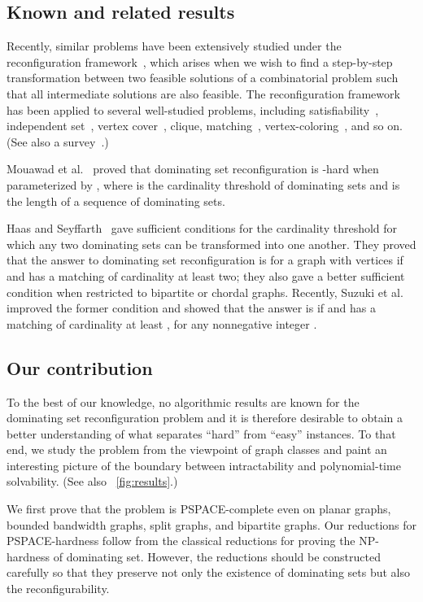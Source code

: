 \documentclass{llncs}
\begin{document}
\subsection{Known and related results}

Recently, similar problems have been extensively studied under the
reconfiguration framework~\cite{IDHPSUU}, which arises when we
wish to find a step-by-step transformation between two feasible solutions of
a combinatorial problem such that all intermediate solutions are also feasible.
The reconfiguration framework has been applied to several well-studied problems, including
{\sc satisfiability}~\cite{Kolaitis},
{\sc independent set}~\cite{HearnDemaine2005,IDHPSUU,KaminskiMM12,MNRSS13,Wro14},
{\sc vertex cover}~\cite{IDHPSUU,INZ14,MNR14,MNRSS13},
{\sc clique}, {\sc matching}~\cite{IDHPSUU},
{\sc vertex-coloring}~\cite{BC09},
and so on. (See also a survey~\cite{van13}.)

Mouawad et al.~\cite{MNRSS13} proved that {\sc dominating set reconfiguration} is -hard
when parameterized by , where  is the cardinality threshold
of dominating sets and  is the length of a sequence of dominating sets.
	
Haas and Seyffarth~\cite{HS14} gave sufficient conditions for the
cardinality threshold  for which any two dominating sets can be transformed into one another.
They proved that the answer to {\sc dominating set reconfiguration} is  for
a graph  with  vertices if  and  has a matching of cardinality at least two;
they also gave a better sufficient condition when restricted to bipartite or chordal graphs.
Recently, Suzuki et al.~\cite{SMN14} improved the former condition and showed
that the answer is  if  and  has a matching of
cardinality at least , for any nonnegative integer .

\subsection{Our contribution}
	
To the best of our knowledge, no algorithmic results are known
for the {\sc dominating set reconfiguration} problem and it is therefore desirable
to obtain a better understanding of what separates ``hard'' from ``easy'' instances.
To that end, we study the problem from the viewpoint of
graph classes and paint an interesting picture of the boundary
between intractability and polynomial-time solvability.
(See also \figurename~\ref{fig:results}.)

We first prove that the problem is PSPACE-complete even on
planar graphs, bounded bandwidth graphs, split graphs, and bipartite graphs.
Our reductions for PSPACE-hardness follow from the classical reductions
for proving the NP-hardness of {\sc dominating set}.
However, the reductions should be constructed carefully so that they preserve
not only the existence of dominating sets but also the reconfigurability.
	
\end{document}

